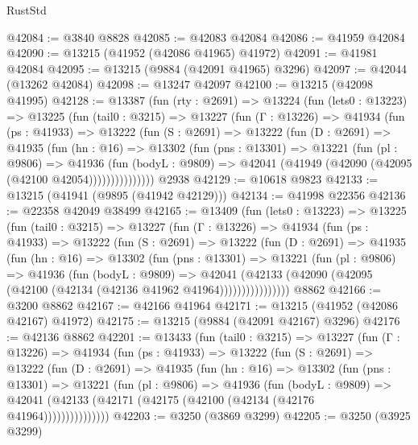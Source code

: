 \begin{lexlean}{RustStd}
\begin{coremodule}
@42084 := @3840 @8828
@42085 := @42083 @42084
@42086 := @41959 @42084
@42090 := @13215 (@41952 (@42086 @41965) @41972)
@42091 := @41981 @42084
@42095 := @13215 (@9884 (@42091 @41965) @3296)
@42097 := @42044 (@13262 @42084)
@42098 := @13247 @42097
@42100 := @13215 (@42098 @41995)
@42128 := @13387
    (fun (rty : @2691) =>
    @13224
      (fun (lets0 : @13223) =>
      @13225
        (fun (tail0 : @3215) =>
        @13227
          (fun (Γ : @13226) =>
          @41934
            (fun (ps : @41933) =>
            @13222
              (fun (S : @2691) =>
              @13222
                (fun (D : @2691) =>
                @41935
                  (fun (hn : @16) =>
                  @13302
                    (fun (pns : @13301) =>
                    @13221
                      (fun (pl : @9806) =>
                      @41936
                        (fun (bodyL : @9809) =>
                        @42041 (@41949 (@42090 (@42095 (@42100 @42054)))))))))))))))
    @2938
@42129 := @10618 @9823
@42133 := @13215 (@41941 (@9895 (@41942 @42129)))
@42134 := @41998 @22356
@42136 := @22358 @42049 @38499
@42165 := @13409
    (fun (lets0 : @13223) =>
    @13225
      (fun (tail0 : @3215) =>
      @13227
        (fun (Γ : @13226) =>
        @41934
          (fun (ps : @41933) =>
          @13222
            (fun (S : @2691) =>
            @13222
              (fun (D : @2691) =>
              @41935
                (fun (hn : @16) =>
                @13302
                  (fun (pns : @13301) =>
                  @13221
                    (fun (pl : @9806) =>
                    @41936
                      (fun (bodyL : @9809) =>
                      @42041
                        (@42133
                          (@42090 (@42095 (@42100 (@42134 (@42136 @41962 @41964))))))))))))))))
    @8862
@42166 := @3200 @8862
@42167 := @42166 @41964
@42171 := @13215 (@41952 (@42086 @42167) @41972)
@42175 := @13215 (@9884 (@42091 @42167) @3296)
@42176 := @42136 @8862
@42201 := @13433
    (fun (tail0 : @3215) =>
    @13227
      (fun (Γ : @13226) =>
      @41934
        (fun (ps : @41933) =>
        @13222
          (fun (S : @2691) =>
          @13222
            (fun (D : @2691) =>
            @41935
              (fun (hn : @16) =>
              @13302
                (fun (pns : @13301) =>
                @13221
                  (fun (pl : @9806) =>
                  @41936
                    (fun (bodyL : @9809) =>
                    @42041 (@42133 (@42171 (@42175 (@42100 (@42134 (@42176 @41964)))))))))))))))
@42203 := @3250 (@3869 @3299)
@42205 := @3250 (@3925 @3299)

\end{coremodule}
\end{lexlean}
